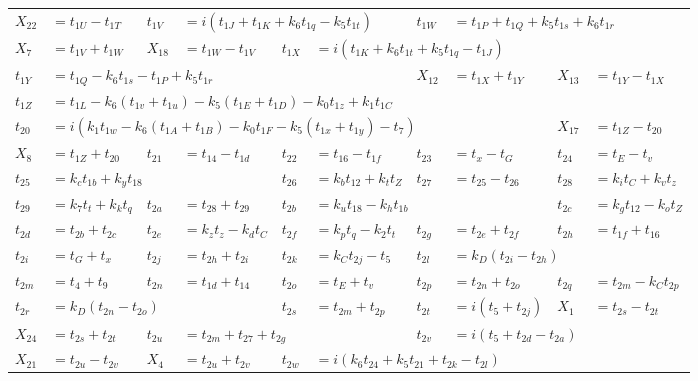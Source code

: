 \begin{tabular}{|p{4.3pt}l|p{4.3pt}l|p{4.3pt}l|p{4.3pt}l|p{4.3pt}l|}
$X_{22} $ &$= t_{1U} - t_{1T}$ & $t_{1V} $ &\multicolumn{3}{l|}{$= i(t_{1J} + t_{1K} + k_6t_{1q} - k_5t_{1t})$} & $t_{1W} $ &\multicolumn{3}{l|}{$= t_{1P} + t_{1Q} + k_5t_{1s} + k_6t_{1r}$}\\ 
$X_7 $ &$= t_{1V} + t_{1W}$ & $X_{18} $ &$= t_{1W} - t_{1V}$ & $t_{1X} $ &\multicolumn{5}{l|}{$= i(t_{1K} + k_6t_{1t} + k_5t_{1q} - t_{1J})$}\\ 
$t_{1Y} $ &\multicolumn{5}{l|}{$= t_{1Q} - k_6t_{1s} - t_{1P} + k_5t_{1r}$} & $X_{12} $ &$= t_{1X} + t_{1Y}$ & $X_{13} $ &$= t_{1Y} - t_{1X}$\\ 
$t_{1Z} $ &\multicolumn{9}{l|}{$= t_{1L} - k_6(t_{1v} + t_{1u}) - k_5(t_{1E} + t_{1D}) - k_0t_{1z} + k_1t_{1C}$}\\ 
$t_{20} $ &\multicolumn{7}{l|}{$= i(k_1t_{1w} - k_6(t_{1A} + t_{1B}) - k_0t_{1F} - k_5(t_{1x} + t_{1y}) - t_7)$} & $X_{17} $ &$= t_{1Z} - t_{20}$\\ 
$X_8 $ &$= t_{1Z} + t_{20}$ & $t_{21} $ &$= t_{14} - t_{1d}$ & $t_{22} $ &$= t_{16} - t_{1f}$ & $t_{23} $ &$= t_x - t_G$ & $t_{24} $ &$= t_E - t_v$\\ 
$t_{25} $ &\multicolumn{3}{l|}{$= k_ct_{1b} + k_yt_{18}$} & $t_{26} $ &$= k_bt_{12} + k_tt_Z$ & $t_{27} $ &$= t_{25} - t_{26}$ & $t_{28} $ &$= k_it_C + k_vt_z$\\ 
$t_{29} $ &$= k_7t_t + k_kt_q$ & $t_{2a} $ &$= t_{28} + t_{29}$ & $t_{2b} $ &\multicolumn{3}{l|}{$= k_ut_{18} - k_ht_{1b}$} & $t_{2c} $ &$= k_gt_{12} - k_ot_Z$\\ 
$t_{2d} $ &$= t_{2b} + t_{2c}$ & $t_{2e} $ &$= k_zt_z - k_dt_C$ & $t_{2f} $ &$= k_pt_q - k_2t_t$ & $t_{2g} $ &$= t_{2e} + t_{2f}$ & $t_{2h} $ &$= t_{1f} + t_{16}$\\ 
$t_{2i} $ &$= t_G + t_x$ & $t_{2j} $ &$= t_{2h} + t_{2i}$ & $t_{2k} $ &$= k_Ct_{2j} - t_5$ & $t_{2l} $ &\multicolumn{3}{l|}{$= k_D(t_{2i} - t_{2h})$}\\ 
$t_{2m} $ &$= t_4 + t_9$ & $t_{2n} $ &$= t_{1d} + t_{14}$ & $t_{2o} $ &$= t_E + t_v$ & $t_{2p} $ &$= t_{2n} + t_{2o}$ & $t_{2q} $ &$= t_{2m} - k_Ct_{2p}$\\ 
$t_{2r} $ &\multicolumn{3}{l|}{$= k_D(t_{2n} - t_{2o})$} & $t_{2s} $ &$= t_{2m} + t_{2p}$ & $t_{2t} $ &$= i(t_5 + t_{2j})$ & $X_1 $ &$= t_{2s} - t_{2t}$\\ 
$X_{24} $ &$= t_{2s} + t_{2t}$ & $t_{2u} $ &\multicolumn{3}{l|}{$= t_{2m} + t_{27} + t_{2g}$} & $t_{2v} $ &\multicolumn{3}{l|}{$= i(t_5 + t_{2d} - t_{2a})$}\\ 
$X_{21} $ &$= t_{2u} - t_{2v}$ & $X_4 $ &$= t_{2u} + t_{2v}$ & $t_{2w} $ &\multicolumn{5}{l|}{$= i(k_6t_{24} + k_5t_{21} + t_{2k} - t_{2l})$}\\ 

\end{tabular}
